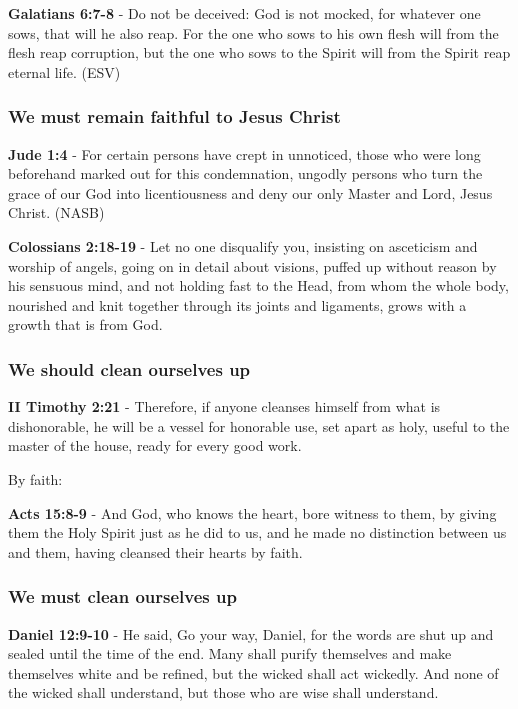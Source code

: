 \documentclass[11pt]{article}
\begin{document}
\textbf{Galatians 6:7-8} - Do not be deceived: God is not mocked, for whatever one sows, that will he also reap. For the one who sows to his own flesh will from the flesh reap corruption, but the one who sows to the Spirit will from the Spirit reap eternal life. (ESV)

\subsubsection{We must remain faithful to Jesus Christ}
\label{sec:org805e3aa}

\textbf{Jude 1:4} - For certain persons have crept in unnoticed, those who were long beforehand marked out for this condemnation, ungodly persons who turn the grace of our God into licentiousness and deny our only Master and Lord, Jesus Christ. (NASB)

\textbf{Colossians 2:18-19} - Let no one disqualify you, insisting on asceticism and worship of angels, going on in detail about visions, puffed up without reason by his sensuous mind, and not holding fast to the Head, from whom the whole body, nourished and knit together through its joints and ligaments, grows with a growth that is from God.

\subsubsection{We \textbf{should} clean ourselves up}
\label{sec:org5fb534c}
\textbf{II Timothy 2:21} - Therefore, if anyone cleanses himself from what is dishonorable, he will be a vessel for honorable use, set apart as holy, useful to the master of the house, ready for every good work.

By faith:

\textbf{Acts 15:8-9} - And God, who knows the heart, bore witness to them, by giving them the Holy Spirit just as he did to us, and he made no distinction between us and them, having cleansed their hearts by faith.

\subsubsection{We \textbf{must} clean ourselves up}
\label{sec:org35205e1}
\textbf{Daniel 12:9-10} - He said, Go your way, Daniel, for the words are shut up and sealed until the time of the end.  Many shall purify themselves and make themselves white and be refined, but the wicked shall act wickedly. And none of the wicked shall understand, but those who are wise shall understand.
\end{document}
